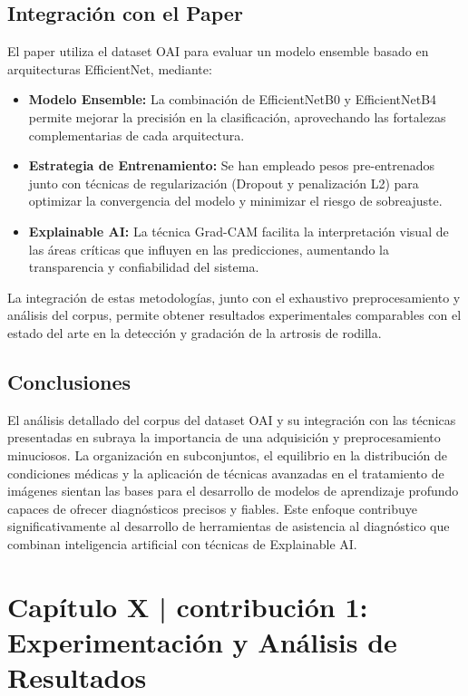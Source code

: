 \documentclass[11pt,spanish,listoffigures,listoftables]{tfgetsinf}
\begin{document}
\section{Integración con el Paper}
El paper \cite{efficientnet_paper} utiliza el dataset OAI para evaluar un modelo ensemble basado en arquitecturas EfficientNet, mediante:

\begin{itemize}
    \item \textbf{Modelo Ensemble:} La combinación de EfficientNetB0 y EfficientNetB4 permite mejorar la precisión en la clasificación, aprovechando las fortalezas complementarias de cada arquitectura.
    \item \textbf{Estrategia de Entrenamiento:} Se han empleado pesos pre-entrenados junto con técnicas de regularización (Dropout y penalización L2) para optimizar la convergencia del modelo y minimizar el riesgo de sobreajuste.
    \item \textbf{Explainable AI:} La técnica Grad-CAM facilita la interpretación visual de las áreas críticas que influyen en las predicciones, aumentando la transparencia y confiabilidad del sistema.
\end{itemize}

La integración de estas metodologías, junto con el exhaustivo preprocesamiento y análisis del corpus, permite obtener resultados experimentales comparables con el estado del arte en la detección y gradación de la artrosis de rodilla.

\section{Conclusiones}
El análisis detallado del corpus del dataset OAI y su integración con las técnicas presentadas en \cite{efficientnet_paper} subraya la importancia de una adquisición y preprocesamiento minuciosos. La organización en subconjuntos, el equilibrio en la distribución de condiciones médicas y la aplicación de técnicas avanzadas en el tratamiento de imágenes sientan las bases para el desarrollo de modelos de aprendizaje profundo capaces de ofrecer diagnósticos precisos y fiables. Este enfoque contribuye significativamente al desarrollo de herramientas de asistencia al diagnóstico que combinan inteligencia artificial con técnicas de Explainable AI.



\chapter{Capítulo X | contribución 1: Experimentación y Análisis de Resultados}
\end{document}
